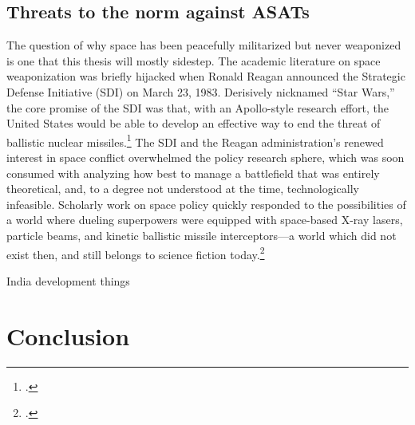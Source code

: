\documentclass{memoir}
\begin{document}
\subsection{Threats to the norm against ASATs}
The question of why space has been peacefully militarized but never weaponized is one that this thesis will mostly sidestep. The academic literature on space weaponization was briefly hijacked when Ronald Reagan announced the Strategic Defense Initiative (SDI) on March 23, 1983. Derisively nicknamed ``Star Wars,'' the core promise of the SDI was that, with an Apollo-style research effort, the United States would be able to develop an effective way to end the threat of ballistic nuclear missiles.\footcite{reagan_address_1983} The SDI and the Reagan administration's renewed interest in space conflict overwhelmed the policy research sphere, which was soon consumed with analyzing how best to manage a battlefield that was entirely theoretical, and, to a degree not understood at the time, technologically infeasible. Scholarly work on space policy quickly responded to the possibilities of a world where dueling superpowers were equipped with space-based X-ray lasers, particle beams, and kinetic ballistic missile interceptors---a world which did not exist then, and still belongs to science fiction today.\footcite[p.~1-2]{mowthorpe_militarization_2004}


India development things

\section{Conclusion}
\newpage
\printbibliography[heading=subbibliography]
\end{document}

